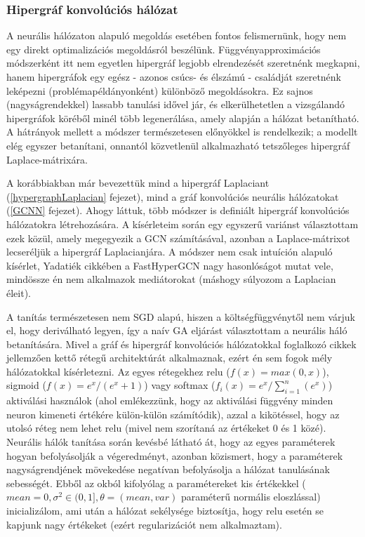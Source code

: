 \subsubsection{Hipergráf konvolúciós hálózat}

A neurális hálózaton alapuló megoldás esetében fontos felismernünk, hogy nem egy direkt optimalizációs megoldásról beszélünk. Függvényapproximációs módszerként itt nem egyetlen hipergráf legjobb elrendezését szeretnénk megkapni, hanem hipergráfok egy egész - azonos csúcs- és élszámú - családját szeretnénk leképezni (problémapéldányonként) különböző megoldásokra. Ez  sajnos (nagyságrendekkel) lassabb tanulási idővel jár, és elkerülhetetlen a vizsgálandó hipergráfok köréből minél több legenerálása, amely alapján a hálózat betanítható. A hátrányok mellett a módszer természetesen előnyökkel is rendelkezik; a modellt elég egyszer betanítani, onnantól közvetlenül alkalmazható tetszőleges hipergráf Laplace-mátrixára.


A korábbiakban már bevezettük mind a hipergráf Laplaciant (\ref{hypergraphLaplacian} fejezet), mind a gráf konvolúciós neurális hálózatokat (\ref{GCNN} fejezet). Ahogy láttuk, több módszer is definiált hipergráf konvolúciós hálózatokra létrehozására. A kísérleteim során egy egyszerű variánst választottam ezek közül, amely megegyezik a GCN számításával, azonban a Laplace-mátrixot lecseréljük a hipergráf Laplacianjára. A módszer nem csak intuíción alapuló kísérlet, Yadatiék cikkében\cite{hgcn} a FastHyperGCN nagy hasonlóságot mutat vele, mindössze én nem alkalmazok mediátorokat (máshogy súlyozom a Laplacian éleit).


A tanítás természetesen nem SGD alapú, hiszen a költségfüggvénytől nem várjuk el, hogy deriválható legyen, így a naív GA eljárást választottam a neurális háló betanítására. Mivel a gráf és hipergráf konvolúciós hálózatokkal foglalkozó cikkek jellemzően kettő rétegű architektúrát alkalmaznak\cite{base_gcnn, hgcn}, ezért én sem fogok mély hálózatokkal kísérletezni. Az egyes rétegekhez relu ($f(x)=max(0,x)$), sigmoid ($f(x)=e^x/(e^x+1)$) vagy softmax ($f_i(x)=e^x/\sum_{i=1}^{n}(e^x)$) aktiválási használok (ahol emlékezzünk, hogy az aktiválási függvény minden neuron kimeneti értékére külön-külön számítódik), azzal a kikötéssel, hogy az utolsó réteg nem lehet relu (mivel nem szorítaná az értékeket 0 és 1 közé). Neurális hálók tanítása során kevésbé látható át, hogy az egyes paraméterek hogyan befolyásolják a végeredményt, azonban közismert, hogy a paraméterek nagyságrendjének mövekedése negatívan befolyásolja a hálózat tanulásának sebességét\cite{nn_regularization}. Ebből az okból kifolyólag a paramétereket kis értékekkel ($mean=0,\sigma^2\in(0,1], \theta = (mean,var)$ paraméterű normális eloszlással) inicializálom, ami után a hálózat sekélysége biztosítja, hogy relu esetén se kapjunk nagy értékeket (ezért regularizációt nem alkalmaztam).

